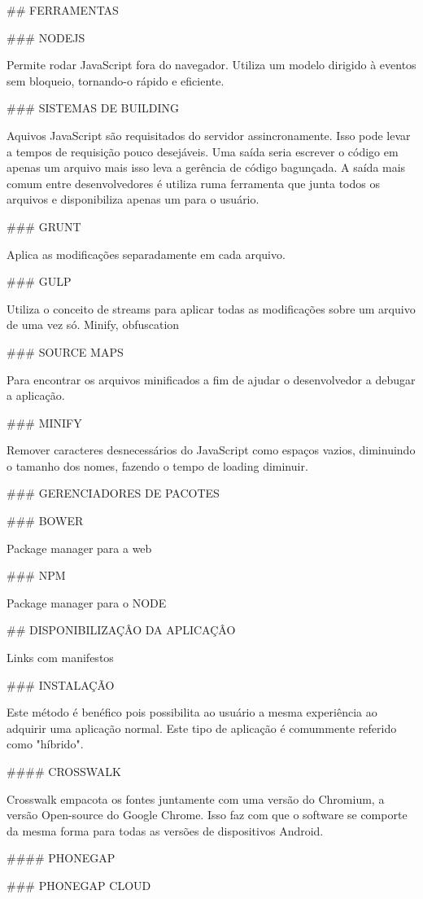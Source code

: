 \documentclass[11pt,a4paper]{article}
\begin{document}
## FERRAMENTAS

### NODEJS

Permite rodar JavaScript fora do navegador. Utiliza um modelo dirigido à eventos sem bloqueio, tornando-o rápido e eficiente.

### SISTEMAS DE BUILDING

Aquivos JavaScript são requisitados do servidor assincronamente. Isso pode levar a tempos de requisição pouco desejáveis. Uma saída seria escrever o código em apenas um arquivo mais isso leva a gerência de código bagunçada. A saída mais comum entre desenvolvedores é utiliza ruma ferramenta que junta todos os arquivos e disponibiliza apenas um para o usuário.

### GRUNT

Aplica as modificações separadamente em cada arquivo.

### GULP

Utiliza o conceito de streams para aplicar todas as modificações sobre um arquivo de uma vez só.
Minify, obfuscation

### SOURCE MAPS

Para encontrar os arquivos minificados a fim de ajudar o desenvolvedor a debugar a aplicação.

### MINIFY

Remover caracteres desnecessários do JavaScript como espaços vazios, diminuindo o tamanho dos nomes, fazendo o tempo de loading diminuir.

### GERENCIADORES DE PACOTES

### BOWER

Package manager para a web

### NPM

Package manager para o NODE

## DISPONIBILIZAÇÂO DA APLICAÇÂO

Links com manifestos

### INSTALAÇÃO

Este método é benéfico pois possibilita ao usuário a mesma experiência ao adquirir uma aplicação normal. Este tipo de aplicação é comummente referido como "híbrido".

#### CROSSWALK

Crosswalk empacota os fontes juntamente com uma versão do Chromium, a versão Open-source do Google Chrome. Isso faz com que o software se comporte da mesma forma para todas as versões de dispositivos Android.

#### PHONEGAP

### PHONEGAP CLOUD
\end{document}
